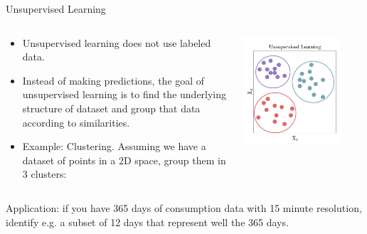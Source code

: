 \begin{frame}[allowframebreaks]{Unsupervised Learning}
  \begin{columns}
    \begin{column}{0.5\textwidth}
  \begin{itemize}
    \item Unsupervised learning does not use labeled data. 
    \item Instead of making predictions, the goal of unsupervised learning is to find the underlying structure of dataset and group that data according to similarities.
    \item Example: Clustering. Assuming we have a dataset of points in a 2D space, group them in 3 clusters:
  \end{itemize}

\end{column}
\begin{column}{0.5\textwidth}
  \begin{center}
    \includegraphics[width=0.8\textwidth]{images/clustering.png}
  \end{center}
\end{column}
\end{columns}
Application: if you have 365 days of consumption data with 15 minute resolution, identify e.g. a subset of 12 days that represent well the 365 days.
\end{frame}

